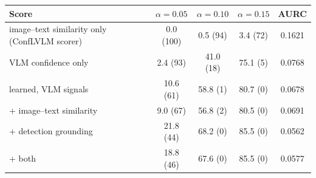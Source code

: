 \begin{tabular}{lcccc}
\toprule
Score & $\alpha{=}0.05$ & $\alpha{=}0.10$ & $\alpha{=}0.15$ & AURC\\
\midrule
image--text similarity only (ConfLVLM scorer) & 0.0 (100) & 0.5 (94) & 3.4 (72) & 0.1621\\
VLM confidence only & 2.4 (93) & 41.0 (18) & 75.1 (5) & 0.0768\\
learned, VLM signals & 10.6 (61) & 58.8 (1) & 80.7 (0) & 0.0678\\
+ image--text similarity & 9.0 (67) & 56.8 (2) & 80.5 (0) & 0.0691\\
+ detection grounding & 21.8 (44) & 68.2 (0) & 85.5 (0) & 0.0562\\
+ both & 18.8 (46) & 67.6 (0) & 85.5 (0) & 0.0577\\
\bottomrule
\end{tabular}

